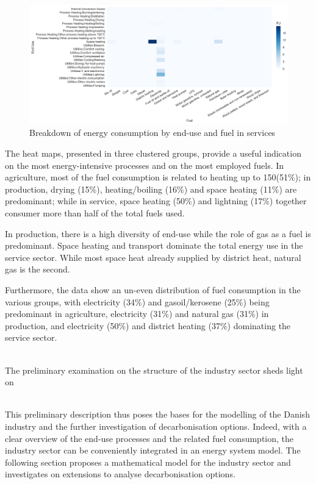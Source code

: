 \documentclass[review]{elsarticle}
\begin{document}
\begin{figure}[H]
\centering
\includegraphics[width=\linewidth]{Img/dan_ind/heatmap_serv.png}
\caption{Breakdown of energy consumption by end-use and fuel in services\cite{VM2015}}
\label{heatmapserv} 
\end{figure}

The heat maps, presented in three clustered groups, provide a useful indication on the most energy-intensive processes and on the most employed fuels. 
In agriculture, most of the fuel consumption is related to heating up to 150\textdegree (51\%); in production, drying (15\%), heating/boiling (16\%) and space heating (11\%) are predominant; while in service, space heating (50\%) and lightning (17\%) together consumer more than half of the total fuels used.

In production, there is a high diversity of end-use while the role of gas as a fuel is predominant. 
Space heating and transport dominate the total energy use in the service sector. While most space heat already supplied by district heat, natural gas is the second.

Furthermore, the data show an un-even distribution of fuel consumption in the various groups, with electricity (34\%) and gasoil/kerosene (25\%) being predominant in agriculture, electricity (31\%) and natural gas (31\%) in production, and electricity (50\%) and district heating (37\%) dominating the service sector.

\\
The preliminary examination on the structure of the industry sector sheds light on 

\\

This preliminary description thus poses the bases for the modelling of the Danish industry and the further investigation of decarbonisation options. Indeed, with a clear overview of the end-use processes and the related fuel consumption, the industry sector can be conveniently integrated in an energy system model. 
The following section proposes a mathematical model for the industry sector and investigates on extensions to analyse decarbonisation options. 
\end{document}
